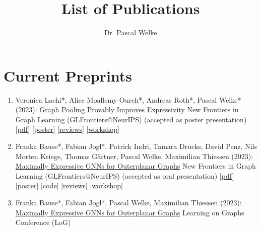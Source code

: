 \documentclass{scrartcl}
\author{Dr. Pascal Welke}
\title{List of Publications}
\begin{document}
\setcounter{saveenumi}{0}
\newcommand{\seti}{\setcounter{saveenumi}{\value{enumi}}}
\newcommand{\conti}{\setcounter{enumi}{\value{saveenumi}}}


\section{Current Preprints}
\begin{enumerate}
\conti
\item
\label{lmrw2023graphpooling}
Veronica Lachi*, Alice Moallemy-Oureh*, Andreas Roth*, Pascal Welke* (2023):\newline
\href{https://openreview.net/forum?id=lR5NYB9zrv}{Graph Pooling Provably Improves Expressivity}\newline
New Frontiers in Graph Learning (GLFrontiers@NeurIPS)\newline
(accepted as poster presentation)\newline
{\footnotesize
[\href{https://pwelke.github.io/publications/lmrw2023pooling.pdf}{pdf}]
[\href{https://pwelke.github.io/publications/lmrw2023pooling-poster.pdf}{poster}]
[\href{https://openreview.net/forum?id=lR5NYB9zrv}{reviews}]
[\href{https://glfrontiers.github.io/}{workshop}]
}
\item
\label{bausejogl2023outerplanarglfrontiers}
Franka Bause*, Fabian Jogl*, Patrick Indri, Tamara Drucks, David Penz, Nils Morten Kriege, Thomas Gärtner, Pascal Welke, Maximilian Thiessen (2023):\newline
\href{https://openreview.net/pdf?id=dn87xnULwF}{Maximally Expressive GNNs for Outerplanar Graphs}\newline
New Frontiers in Graph Learning (GLFrontiers@NeurIPS)\newline
(accepted as oral presentation)\newline
{\footnotesize
[\href{https://openreview.net/pdf?id=dn87xnULwF}{pdf}]
[\href{https://pwelke.github.io/publications/bause2023outerplanar-poster.pdf}{poster}]
[\href{https://github.com/ocatias/outerplanarGNNs/}{code}]
[\href{https://openreview.net/forum?id=gXCqzpvhuD}{reviews}]
[\href{https://glfrontiers.github.io/}{workshop}]
}
\item
\label{bausejogl2023outerplanarlog}
Franka Bause*, Fabian Jogl*, Pascal Welke, Maximilian Thiessen (2023):\newline
\href{https://openreview.net/forum?id=7vyGCFTajk}{Maximally Expressive GNNs for Outerplanar Graphs}\newline
Learning on Graphs Conference (LoG)\newline

\end{enumerate}
\end{document}
